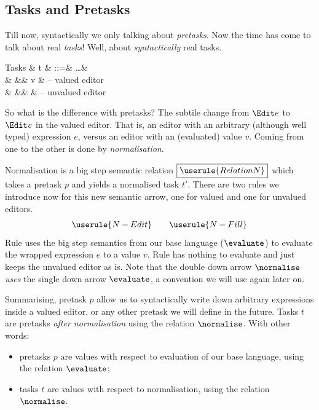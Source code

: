\subsection{Tasks and Pretasks}

Till now, syntactically we only talking about \emph{pretasks}.
Now the time has come to talk about real \emph{tasks}!
Well, about \emph{syntactically} real tasks.
\begin{grammar}
  Tasks
    & t & ::=& \ldots      & \\
    &   &\mid& \Edit v     & – valued editor \\
    &   &\mid& \Fill \beta & – unvalued editor \\
\end{grammar}

So what is the difference with pretasks?
The subtile change from $\Edit e$ to $\Edit v$ in the valued editor.
That is, an editor with an arbitrary (although well typed) expression $e$,
versus an editor with an (evaluated) value $v$.
Coming from one to the other is done by \emph{normalisation}.

Normalisation is a big step semantic relation $\boxed{\userule{RelationN}}$ which takes a pretask $p$
and yields a normalised task $t'$.
There are two rules we introduce now for this new semantic arrow,
one for valued and one for unvalued editors.
\begin{equation*}
  \userule{N-Edit} \qquad \userule{N-Fill}
\end{equation*}
Rule  uses the big step semantics from our base language ($\evaluate$)
to evaluate the wrapped expression $e$ to a value $v$.
Rule  has nothing to evaluate and just keeps the unvalued editor as is.
Note that the double down arrow $\normalise$ \emph{uses} the single down arrow $\evaluate$,
a convention we will use again later on.

Summarising, pretask $p$ allow us to syntactically write down arbitrary expressions inside a valued editor,
or any other pretask we will define in the future.
Tasks $t$ are pretasks \emph{after normalisation} using the relation $\normalise$.
With other words:
\begin{itemize}
  \item pretasks $p$ are values with respect to evaluation of our base language, using the relation $\evaluate$;
  \item tasks $t$ are values with respect to normalisation, using the relation $\normalise$.
\end{itemize}


